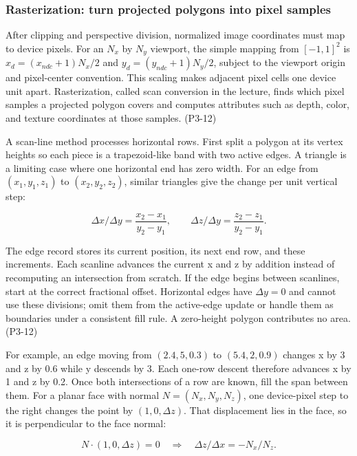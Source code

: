 \subsubsection{Rasterization: turn projected polygons into pixel samples}\label{03-visual-computing-i-ch018-rasterization-turn-projected-polygons-into-pixel-samples}

After clipping and perspective division, normalized image coordinates must map to device pixels. For an \(N_x\) by \(N_y\) viewport, the simple mapping from \([-1,1]^2\) is \(x_d=(x_{ndc}+1)N_x/2\) and \(y_d=(y_{ndc}+1)N_y/2\), subject to the viewport origin and pixel-center convention. This scaling makes adjacent pixel cells one device unit apart. Rasterization, called scan conversion in the lecture, finds which pixel samples a projected polygon covers and computes attributes such as depth, color, and texture coordinates at those samples. (P3-12)

A scan-line method processes horizontal rows. First split a polygon at its vertex heights so each piece is a trapezoid-like band with two active edges. A triangle is a limiting case where one horizontal end has zero width. For an edge from \((x_1,y_1,z_1)\) to \((x_2,y_2,z_2)\), similar triangles give the change per unit vertical step:

\[
\Delta x/\Delta y=\frac{x_2-x_1}{y_2-y_1},\qquad
\Delta z/\Delta y=\frac{z_2-z_1}{y_2-y_1}.
\]

The edge record stores its current position, its next end row, and these increments. Each scanline advances the current x and z by addition instead of recomputing an intersection from scratch. If the edge begins between scanlines, start at the correct fractional offset. Horizontal edges have \(\Delta y=0\) and cannot use these divisions; omit them from the active-edge update or handle them as boundaries under a consistent fill rule. A zero-height polygon contributes no area. (P3-12)

For example, an edge moving from \((2.4,5,0.3)\) to \((5.4,2,0.9)\) changes x by 3 and z by 0.6 while y descends by 3. Each one-row descent therefore advances x by 1 and z by 0.2. Once both intersections of a row are known, fill the span between them. For a planar face with normal \(N=(N_x,N_y,N_z)\), one device-pixel step to the right changes the point by \((1,0,\Delta z)\). That displacement lies in the face, so it is perpendicular to the face normal:

\[
N\cdot(1,0,\Delta z)=0\quad\Rightarrow\quad\Delta z/\Delta x=-N_x/N_z.
\]

